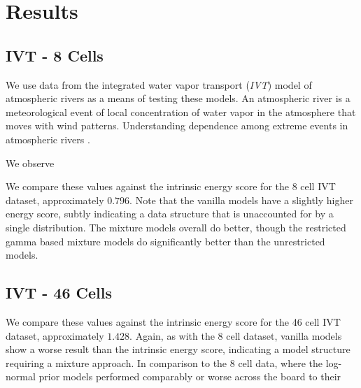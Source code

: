 
\section{Results}

\subsection{IVT - 8 Cells}
We use data from the integrated water vapor transport (\emph{IVT}) model
  of atmospheric rivers as a means of testing these models.  An atmospheric river is a meteorological
  event of local concentration of water vapor in the atmosphere that moves with wind patterns.
  Understanding dependence among extreme events in atmospheric rivers .

We observe




We compare these values against the intrinsic energy score for the 8 cell IVT dataset, approximately
  $0.796$.  Note that the vanilla models have a slightly higher energy score, subtly indicating a
  data structure that is unaccounted for by a single distribution.  The mixture models overall do
  better, though the restricted gamma based mixture models do significantly better than the
  unrestricted models.

\subsection{IVT - 46 Cells}


We compare these values against the intrinsic energy score for the 46 cell IVT dataset, approximately
  $1.428$.  Again, as with the 8 cell dataset, vanilla models show a worse result than the intrinsic
  energy score, indicating a model structure requiring a mixture approach.  In comparison to the
  8 cell data, where the log-normal prior models performed comparably or worse across the board to
  their








